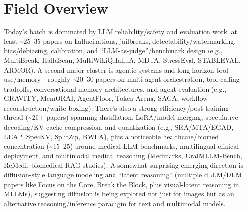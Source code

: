 \documentclass[12pt,letterpaper]{article}
\begin{document}
\section*{Field Overview}
{\footnotesize Today's batch is dominated by LLM reliability/safety and evaluation work: at least \textasciitilde{}25--35 papers on hallucinations, jailbreaks, detectability/watermarking, bias/debiasing, calibration, and ``LLM-as-judge''/benchmark design (e.g., MultiBreak, HalluScan, MultiWikiQHalluA, MDTA, StressEval, STABLEVAL, ARMOR). A second major cluster is agentic systems and long-horizon tool use/memory---roughly \textasciitilde{}20--30 papers on multi-agent orchestration, tool-calling tradeoffs, conversational memory architectures, and agent evaluation (e.g., GRAVITY, MemORAI, AgentFloor, Token Arena, SAGA, workflow reconstruction/white-boxing). There's also a strong efficiency/post-training thread (\textasciitilde{}20+ papers) spanning distillation, LoRA/model merging, speculative decoding/KV-cache compression, and quantization (e.g., SRA/MTA/EGAD, LEAP, SpecKV, SplitZip, BWLA), plus a noticeable healthcare/biomed concentration (\textasciitilde{}15--25) around medical LLM benchmarks, multilingual clinical deployment, and multimodal medical reasoning (Medmarks, OralMLLM-Bench, ReMedi, biomedical RAG studies). A somewhat surprising emerging direction is diffusion-style language modeling and ``latent reasoning'' (multiple dLLM/DLM papers like Focus on the Core, Break the Block, plus visual-latent reasoning in MLLMs), suggesting diffusion is being explored not just for images but as an alternative reasoning/inference paradigm for text and multimodal models.}
\end{document}
